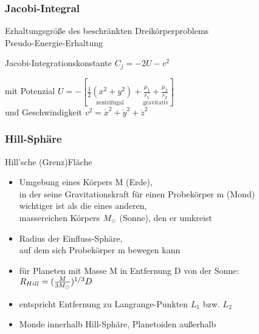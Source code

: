 \documentclass{beamer}
\begin{document}
\begin{frame}\frametitle{Jacobi-Integral}

Erhaltungsgröße des beschränkten Dreikörperproblems\\[.1cm]

Pseudo-Energie-Erhaltung

\begin{block}{Jacobi-Integrationskonstante}
$C_j = -2U - v^2$
\end{block}

\hspace{3cm}

mit Potenzial $U = - [\underset{\text{zentrifugal}}{\frac{1}{2}(x^2 + y^2)} + \underset{\text{gravitativ}}{\frac{\mu_1}{r_1} + \frac{\mu_2}{r_2}}]$\\

und Geschwindigkeit $v^2 = \dot{x}^2 + \dot{y}^2 + \dot{z}^2$

\end{frame}

\begin{frame}\frametitle{Hill-Sphäre}

\begin{block}{Hill'sche (Grenz)Fläche}

\begin{itemize}
\item Umgebung eines Körpers M (Erde),\\ in der seine Gravitationskraft für einen Probekörper m (Mond)\\ wichtiger ist als die eines anderen,\\ massereichen Körpers $M_{\tiny\astrosun}$ (Sonne), den er umkreist
\item Radius der Einfluss-Sphäre,\\ auf dem sich Probekörper m bewegen kann
\item für Planeten mit Masse M in Entfernung D von der Sonne: $R_{Hill} = (\frac{M}{3M_{\tiny\astrosun}})^{1/3} D$
\item entspricht Entfernung zu Langrange-Punkten $L_1$ bzw. $L_2$
\item Monde innerhalb Hill-Sphäre, Planetoiden außerhalb
\end{itemize}

\end{block} 

\end{frame}
\end{document}
